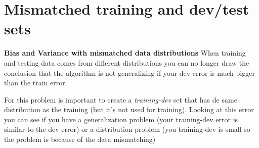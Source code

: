 \section*{Mismatched training and dev/test sets}

\textbf{Bias and Variance with mismatched data distributions} When training and testing 
data comes from different distributions you can no longer draw the conclusion that the 
algorithm is not generalizing if your dev error ir much bigger than the train error. 

For this problem is important to create a \textit{training-dev} set that has de same distribution
as the training (but it's not used for training). Looking at this error you can see if you 
have a generalization problem (your training-dev error is similar to the dev error) or a
distribution problem (you training-dev is small so the problem is because of the data mismatching)




